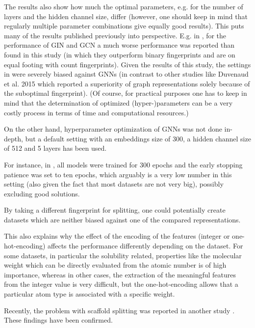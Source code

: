 The results also show how much the optimal parameters, e.g. for the number of layers and the hidden channel size, differ (however, one should keep in mind that regularly multiple parameter combinations give equally good results). This puts many of the results published previously into perspective.
E.g. in \cite{Deng.2023}, for the performance of GIN and GCN a much worse performance was reported than found in this study (in which they outperform binary fingerprints and are on equal footing with count fingerprints).
Given the results of this study, the settings in \cite{Deng.2023} were severely biased against GNNs (in contrast to other studies like Duvenaud et al. 2015 which reported a superiority of graph representations solely because of the suboptimal fingerprint).
(Of course, for practical purposes one has to keep in mind that the determination of optimized (hyper-)parameters can be a very costly process in terms of time and computational resources.) 

On the other hand, hyperparameter optimization of GNNs was not done in-depth, but a default setting with an embeddings size of 300, a hidden channel size of 512 and 5 layers has been used.

For instance, in \cite{vanTilborg.2022}, all models were trained for 300 epochs and the early stopping patience was set to ten epochs, which arguably is a very low number in this setting (also given the fact that most datasets are not very big), possibly excluding good solutions.

By taking a different fingerprint for splitting, one could potentially create datasets which are neither biased against one of the compared representations.

This also explains why the effect of the encoding of the features (integer or one-hot-encoding) affects the performance differently depending on the dataset. For some datasets, in particular the solubility related, properties like the molecular weight which can be directly evaluated from the atomic number is of high importance, whereas in other cases, the extraction of the meaningful features from the integer value is very difficult, but the one-hot-encoding allows that a particular atom type is associated with a specific weight.


Recently, the problem with scaffold splitting was reported in another study \cite{Zhang.2024}.
These findings have been confirmed.


\cite{Comparison of fingerprint and GNN performance}

